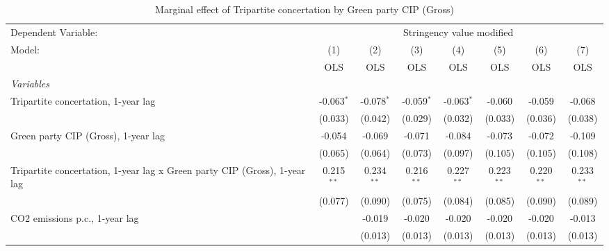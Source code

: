 
\begin{table}[htbp]
   \caption{Marginal effect of Tripartite concertation by Green party CIP (Gross)}
   \centering
   \begin{tabular}{lccccccc}
      \toprule
      Dependent Variable: & \multicolumn{7}{c}{Stringency value modified}\\
      Model:                                                                    & (1)          & (2)          & (3)          & (4)          & (5)          & (6)          & (7)\\  
                                                                                &  OLS         & OLS          & OLS          & OLS          & OLS          & OLS          & OLS\\  
      \midrule
      \emph{Variables}\\
      Tripartite concertation, 1-year lag                                       & -0.063$^{*}$ & -0.078$^{*}$ & -0.059$^{*}$ & -0.063$^{*}$ & -0.060       & -0.059       & -0.068\\   
                                                                                & (0.033)      & (0.042)      & (0.029)      & (0.032)      & (0.033)      & (0.036)      & (0.038)\\   
      Green party CIP (Gross), 1-year lag                                       & -0.054       & -0.069       & -0.071       & -0.084       & -0.073       & -0.072       & -0.109\\   
                                                                                & (0.065)      & (0.064)      & (0.073)      & (0.097)      & (0.105)      & (0.105)      & (0.108)\\   
      Tripartite concertation, 1-year lag x Green party CIP (Gross), 1-year lag & 0.215$^{**}$ & 0.234$^{**}$ & 0.216$^{**}$ & 0.227$^{**}$ & 0.223$^{**}$ & 0.220$^{**}$ & 0.233$^{**}$\\   
                                                                                & (0.077)      & (0.090)      & (0.075)      & (0.084)      & (0.085)      & (0.090)      & (0.089)\\   
      CO2 emissions p.c., 1-year lag                                            &              & -0.019       & -0.020       & -0.020       & -0.020       & -0.020       & -0.013\\   
                                                                                &              & (0.013)      & (0.013)      & (0.013)      & (0.013)      & (0.013)      & (0.013)\\   

\end{tabular}
\end{table}
